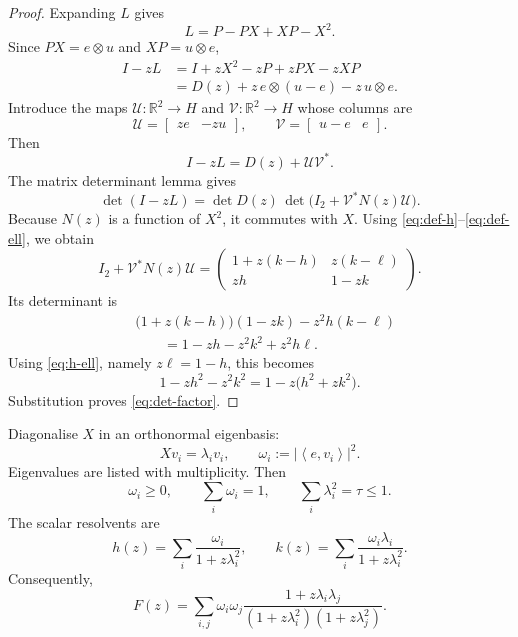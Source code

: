 \documentclass[11pt]{article}
\newcommand{\R}{\mathbb{R}}
\newcommand{\ip}[2]{\left\langle #1,#2\right\rangle}
\begin{document}
\begin{proof}
Expanding $L$ gives
\[
  L=P-PX+XP-X^2.
\]
Since $PX=e\otimes u$ and $XP=u\otimes e$,
\begin{align*}
  I-zL
  &=I+zX^2-zP+zPX-zXP\\
  &=D(z)+z\,e\otimes(u-e)-z\,u\otimes e.
\end{align*}
Introduce the maps $\mathcal U\colon\R^2\to H$ and
$\mathcal V\colon\R^2\to H$ whose columns are
\[
  \mathcal U=\begin{bmatrix}ze&-zu\end{bmatrix},
  \qquad
  \mathcal V=\begin{bmatrix}u-e&e\end{bmatrix}.
\]
Then
\[
  I-zL=D(z)+\mathcal U\mathcal V^*.
\]
The matrix determinant lemma gives
\[
  \det(I-zL)
  =\det D(z)\,
  \det\bigl(I_2+\mathcal V^*N(z)\mathcal U\bigr).
\]
Because $N(z)$ is a function of $X^2$, it commutes with $X$.  Using
\eqref{eq:def-h}--\eqref{eq:def-ell}, we obtain
\[
  I_2+\mathcal V^*N(z)\mathcal U
  =
  \begin{pmatrix}
    1+z(k-h) & z(k-\ell)\\
    zh       & 1-zk
  \end{pmatrix}.
\]
Its determinant is
\begin{align*}
 &\bigl(1+z(k-h)\bigr)(1-zk)-z^2h(k-\ell)\\
 &\qquad
 =1-zh-z^2k^2+z^2h\ell.
\end{align*}
Using \eqref{eq:h-ell}, namely $z\ell=1-h$, this becomes
\[
  1-zh^2-z^2k^2
  =1-z\bigl(h^2+zk^2\bigr).
\]
Substitution proves \eqref{eq:det-factor}.
\end{proof}

Diagonalise $X$ in an orthonormal eigenbasis:
\[
  Xv_i=\lambda_i v_i,
  \qquad
  \omega_i:=|\ip{e}{v_i}|^2.
\]
Eigenvalues are listed with multiplicity.  Then
\begin{equation}
  \omega_i\ge0,
  \qquad
  \sum_i\omega_i=1,
  \qquad
  \sum_i\lambda_i^2=\tau\le1.
  \label{eq:spectral-budget}
\end{equation}
The scalar resolvents are
\begin{equation}
  h(z)=\sum_i\frac{\omega_i}{1+z\lambda_i^2},
  \qquad
  k(z)=\sum_i\frac{\omega_i\lambda_i}{1+z\lambda_i^2}.
  \label{eq:h-k-spectral}
\end{equation}
Consequently,
\begin{equation}
  F(z)
  =
  \sum_{i,j}\omega_i\omega_j
  \frac{1+z\lambda_i\lambda_j}
       {(1+z\lambda_i^2)(1+z\lambda_j^2)}.
  \label{eq:F-double}
\end{equation}
\end{document}
